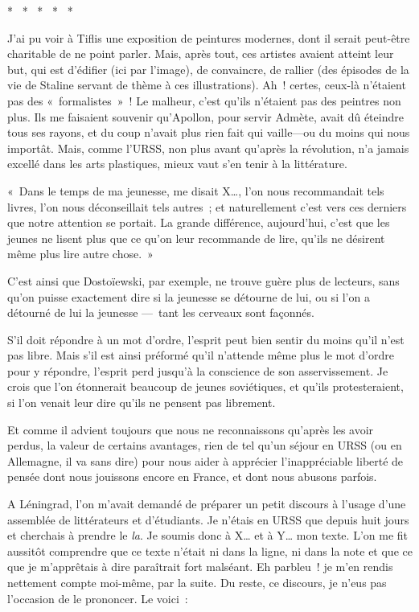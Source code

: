 \documentclass[french,twoside]{book} %
\begin{document}
\begin{center}
\noindent \centerline{*  *  *  *  *}\par
\end{center}

\noindent J’ai pu voir à Tiflis une exposition de peintures modernes, dont il serait peut-être charitable de ne point parler. Mais, après tout, ces artistes avaient atteint leur but, qui est d’édifier (ici par l’image), de convaincre, de rallier (des épisodes de la vie de Staline servant de thème à ces illustrations). Ah ! certes, ceux-là n’étaient pas des « formalistes » ! Le malheur, c’est qu’ils n’étaient pas des peintres non plus. Ils me faisaient souvenir qu’Apollon, pour servir Admète, avait dû éteindre tous ses rayons, et du coup n’avait plus rien fait qui vaille—ou du moins qui nous importât. Mais, comme l’URSS, non plus avant qu’après la révolution, n’a jamais excellé dans les arts plastiques, mieux vaut s’en tenir à la littérature.\par
« Dans le temps de ma jeunesse, me disait X…, l’on nous recommandait tels livres, l’on nous déconseillait tels autres ; et naturellement c’est vers ces derniers que notre attention se portait. La grande différence, aujourd’hui, c’est que les jeunes ne lisent plus que ce qu’on leur recommande de lire, qu’ils ne désirent même plus lire autre chose. »\par
C’est ainsi que Dostoïewski, par exemple, ne trouve guère plus de lecteurs, sans qu’on puisse exactement dire si la jeunesse se détourne de lui, ou si l’on a détourné de lui la jeunesse — tant les cerveaux sont façonnés.\par
S’il doit répondre à un mot d’ordre, l’esprit peut bien sentir du moins qu’il n’est pas libre. Mais s’il est ainsi préformé qu’il n’attende même plus le mot d’ordre pour y répondre, l’esprit perd jusqu’à la conscience de son asservissement. Je crois que l’on étonnerait beaucoup de jeunes soviétiques, et qu’ils protesteraient, si l’on venait leur dire qu’ils ne pensent pas librement.\par
Et comme il advient toujours que nous ne reconnaissons qu’après les avoir perdus, la valeur de certains avantages, rien de tel qu’un séjour en URSS (ou en Allemagne, il va sans dire) pour nous aider à apprécier l’inappréciable liberté de pensée dont nous jouissons encore en France, et dont nous abusons parfois.\par
A Léningrad, l’on m’avait demandé de préparer un petit discours à l’usage d’une assemblée de littérateurs et d’étudiants. Je n’étais en URSS que depuis huit jours et cherchais à prendre le \emph{la}. Je soumis donc à X… et à Y… mon texte. L’on me fit aussitôt comprendre que ce texte n’était ni dans la ligne, ni dans la note et que ce que je m’apprêtais à dire paraîtrait fort malséant. Eh parbleu ! je m’en rendis nettement compte moi-même, par la suite. Du reste, ce discours, je n’eus pas l’occasion de le prononcer. Le voici :\par
\end{document}
